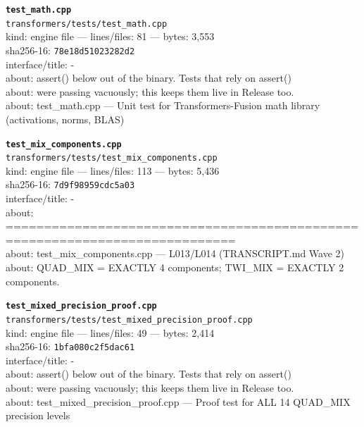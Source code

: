 \noindent\textbf{\texttt{test\_math.cpp}}\\
\texttt{transformers/tests/test\_math.cpp}\\
kind: engine file --- lines/files: 81 --- bytes: 3,553\\
sha256-16: \texttt{78e18d51023282d2}\\
interface/title: -\\
about: assert() below out of the binary. Tests that rely on assert()\\
about: were passing vacuously; this keeps them live in Release too.\\
about: test\_math.cpp — Unit test for Transformers-Fusion math library (activations, norms, BLAS)\\
\vspace*{6.0pt}
\newpage

\noindent\textbf{\texttt{test\_mix\_components.cpp}}\\
\texttt{transformers/tests/test\_mix\_components.cpp}\\
kind: engine file --- lines/files: 113 --- bytes: 5,436\\
sha256-16: \texttt{7d9f98959cdc5a03}\\
interface/title: -\\
about: ============================================================================\\
about: test\_mix\_components.cpp — L013/L014 (TRANSCRIPT.md Wave 2)\\
about: QUAD\_MIX = EXACTLY 4 components; TWI\_MIX = EXACTLY 2 components.\\
\vspace*{6.0pt}

\noindent\textbf{\texttt{test\_mixed\_precision\_proof.cpp}}\\
\texttt{transformers/tests/test\_mixed\_precision\_proof.cpp}\\
kind: engine file --- lines/files: 49 --- bytes: 2,414\\
sha256-16: \texttt{1bfa080c2f5dac61}\\
interface/title: -\\
about: assert() below out of the binary. Tests that rely on assert()\\
about: were passing vacuously; this keeps them live in Release too.\\
about: test\_mixed\_precision\_proof.cpp — Proof test for ALL 14 QUAD\_MIX precision levels\\
\vspace*{6.0pt}

